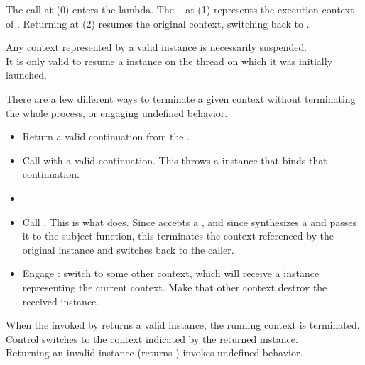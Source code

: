 The  call at (0) enters the lambda. The \cont\  at (1)
represents the execution context of \main. Returning  at (2) resumes the
original context, switching back to \main.



Any context represented by a valid \cont instance is necessarily suspended.\\

It is only valid to resume a \cont instance on the thread on which it was initially
launched.



There are a few different ways to terminate a given context without
terminating the whole process, or engaging undefined behavior.

\begin{itemize}
    \item Return a valid continuation from the \entryfn.
    \item Call \unwindcont with a valid continuation. This throws a \unwindex
          instance that binds that continuation.
    \item {}
    \item Call .
          This is what \dtor does. Since \unwindcont accepts a \cont, and
          since \resumewith synthesizes a \cont and passes it to the subject function,
          this terminates the context referenced by the original \cont instance and
          switches back to the caller.
    \item Engage \dtor: switch to some other context, which will
          receive a \cont instance representing the current context. Make that other
          context destroy the received \cont instance.
\end{itemize}

When the \entryfn invoked by \callcc returns a valid \cont instance,
the running context is terminated. Control switches to the context
indicated by the returned \cont instance.\\

Returning an invalid \cont instance (\opbool returns ) invokes
undefined behavior.\\

